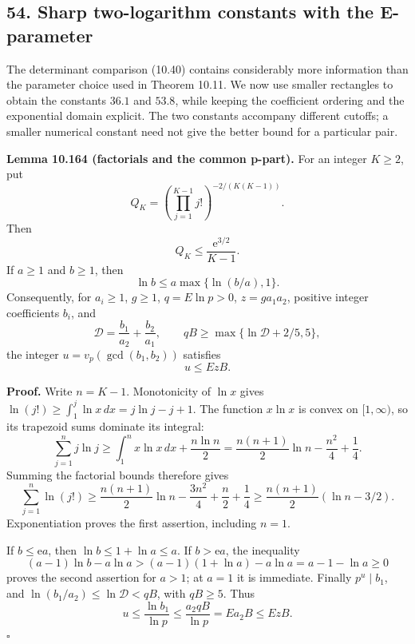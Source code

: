 \documentclass[
  11pt,
  a4paper,
]{article}
\begin{document}
\subsection{54. Sharp two-logarithm constants with the
E-parameter}\label{sharp-two-logarithm-constants-with-the-e-parameter}

The determinant comparison (10.40) contains considerably more
information than the parameter choice used in Theorem 10.11. We now use
smaller rectangles to obtain the constants \(36.1\) and \(53.8\), while
keeping the coefficient ordering and the exponential domain explicit.
The two constants accompany different cutoffs; a smaller numerical
constant need not give the better bound for a particular pair.

\textbf{Lemma 10.164 (factorials and the common p-part).} For an integer
\(K\ge2\), put \[
Q_K=\left(\prod_{j=1}^{K-1}j!\right)^{-2/(K(K-1))}.
\tag{10.541}
\] Then \[
Q_K\le\frac{\mathrm e^{3/2}}{K-1}.
\tag{10.542}
\] If \(a\ge1\) and \(b\ge1\), then \[
\ln b\le a\max\{\ln(b/a),1\}.
\tag{10.543}
\] Consequently, for \(a_i\ge1\), \(g\ge1\), \(q=E\ln p>0\),
\(z=ga_1a_2\), positive integer coefficients \(b_i\), and \[
\mathcal D=\frac{b_1}{a_2}+\frac{b_2}{a_1},\qquad
qB\ge\max\{\ln\mathcal D+2/5,5\},
\tag{10.544}
\] the integer \(u=v_p(\gcd(b_1,b_2))\) satisfies \[
u\le EzB.
\tag{10.545}
\]

\textbf{Proof.} Write \(n=K-1\). Monotonicity of \(\ln x\) gives
\(\ln(j!)\ge\int_1^j\ln x\,dx=j\ln j-j+1\). The function \(x\ln x\) is
convex on \([1,\infty)\), so its trapezoid sums dominate its integral:
\[
\sum_{j=1}^{n}j\ln j
\ge\int_1^n x\ln x\,dx+\frac{n\ln n}{2}
=\frac{n(n+1)}2\ln n-\frac{n^2}{4}+\frac14.
\tag{10.546}
\] Summing the factorial bounds therefore gives \[
\sum_{j=1}^{n}\ln(j!)
\ge\frac{n(n+1)}2\ln n-\frac{3n^2}{4}+\frac n2+\frac14
\ge\frac{n(n+1)}2(\ln n-3/2).
\tag{10.547}
\] Exponentiation proves the first assertion, including \(n=1\).

If \(b\le\mathrm e a\), then \(\ln b\le1+\ln a\le a\). If
\(b>\mathrm e a\), the inequality \[
(a-1)\ln b-a\ln a
\mathrel{>}(a-1)(1+\ln a)-a\ln a
=a-1-\ln a\ge0
\tag{10.548}
\] proves the second assertion for \(a>1\); at \(a=1\) it is immediate.
Finally \(p^u\mid b_1\), and \(\ln(b_1/a_2)\le\ln\mathcal D<qB\), with
\(qB\ge5\). Thus \[
u\le\frac{\ln b_1}{\ln p}
\le\frac{a_2qB}{\ln p}=Ea_2B\le EzB.
\tag{10.549}
\] \(\square\)
\end{document}
